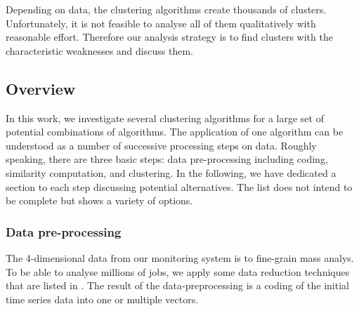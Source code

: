 \documentclass[]{llncs}
\begin{document}
Depending on data, the clustering algorithms create thousands of clusters.
Unfortunately, it is not feasible to analyse all of them qualitatively with reasonable effort.
Therefore our analysis strategy is to find clusters with the characteristic weaknesses and discuss them.

\subsection{Overview}
In this work, we investigate several clustering algorithms for a large set of potential combinations of algorithms. The application of one algorithm can be understood as a number of successive processing steps on data. Roughly speaking, there are three basic steps: data pre-processing including coding, similarity computation, and clustering. In the following, we have dedicated a section to each step discussing potential alternatives. The list does not intend to be complete but shows a variety of options.

\subsubsection{Data pre-processing}
The 4-dimensional data from our monitoring system is to fine-grain mass analys. To be able to analyse millions of jobs, we apply some data reduction techniques that are listed in .
The result of the data-preprocessing is a coding of the initial time series data into one or multiple vectors.
\end{document}
